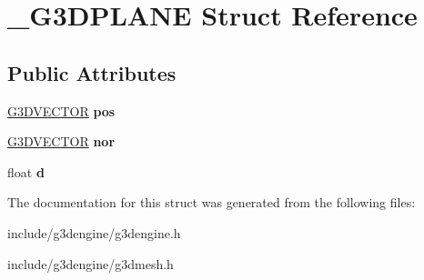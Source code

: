 \hypertarget{struct__G3DPLANE}{}\section{\+\_\+\+G3\+D\+P\+L\+A\+NE Struct Reference}
\label{struct__G3DPLANE}
\subsection*{Public Attributes}
\begin{DoxyCompactItemize}
\item 
\mbox{\label{struct__G3DPLANE_a003c1d4282052dc6040c579ac70aa954}} 
\hyperlink{struct__G3DVECTOR}{G3\+D\+V\+E\+C\+T\+OR} {\bfseries pos}
\item 
\mbox{\label{struct__G3DPLANE_aeb5e273d2ca0a88368dd15af52df9410}} 
\hyperlink{struct__G3DVECTOR}{G3\+D\+V\+E\+C\+T\+OR} {\bfseries nor}
\item 
\mbox{\label{struct__G3DPLANE_aba12743b0843886968588b8ad9cc1995}} 
float {\bfseries d}
\end{DoxyCompactItemize}


The documentation for this struct was generated from the following files\+:\begin{DoxyCompactItemize}
\item 
include/g3dengine/g3dengine.\+h\item 
include/g3dengine/g3dmesh.\+h\end{DoxyCompactItemize}
